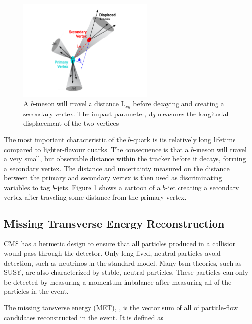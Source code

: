 \begin{figure}[h]
   \centering
  \includegraphics[width=0.6\textwidth]{Figures/Reconstruction_Diagrams/Jets__bTagging.pdf}
  \caption{A $b$-meson will travel a distance L$_{xy}$ before decaying
  and creating a secondary vertex.  The impact parameter, d$_{0}$
  measures the longitudal displacement of the two vertices} \label{fig:bTagging}
\end{figure}

\par The most important characteristic of the $b$-quark is its
relatively long lifetime compared to lighter-flavour quarks.  The
consequence is that a $b$-meson will travel a very small, but
observable distance within the tracker before it decays, forming a
secondary vertex.  The distance and uncertainty measured on the
distance between the primary and secondary vertex is then used as
discriminating variables to tag $b$-jets.  Figure \ref{fig:bTagging}
shows a cartoon of a $b$-jet creating a secondary vertex after
traveling some distance from the primary vertex.   

\subsection{Missing Transverse Energy Reconstruction}

\par CMS has a hermetic design to ensure that all particles produced
in a collision would pass through the detector.  Only long-lived,
neutral particles avoid detection, such as neutrinos in the standard
model.  Many \acrshort{bsm} theories, such as SUSY, are also
characterized by stable, neutral particles.  These particles can only
be detected by measuring a momentum imbalance after measuring all of
the particles in the event.

\par The missing tansverse energy (MET), \ETslash, is the vector sum of
all of particle-flow candidates reconstructed in the event.  It is
defined as 


